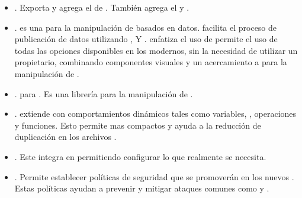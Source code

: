 \begin{itemize}
		\item
			\textbf{\bunyanPackage}. Exporta y agrega el \moduleAS de \loggingCPT \bunyanNAME. También agrega el \clientAS \browserifyNAME y \bunyanprettyStreamMETEOR.
		\item
			\textbf{\dThreePackage}. \dddNAME es una \libraryPC	\javaScriptNAME para la manipulación de  \documentsDB basados en datos. \dThreePackage facilita el proceso de publicación de datos utilizando \htmlNAME, \svgNAME Y \cssNAME. \dThreePackage enfatiza el uso de \webStandardINT permite el uso de todas las opciones disponibles en los \browsersINT modernos, sin la necesidad de utilizar un \frameworkPC propietario, combinando componentes visuales y un acercamiento a \dataDrivenCPT para la manipulación de \htmldomNAME.
		\item
			\textbf{\undStringLatestPackage}. \undStringLatestMETEOR \packageAS para \meteorNAME. Es una librería para la manipulación de \stringsPL.
		\item
			\textbf{\lessPackage}. \lessNAME extiende \cssNAME con comportamientos dinámicos tales como variables, \mixinsNAME, operaciones y funciones. Esto permite  \stylesheetsNAME mas compactos y ayuda a la reducción de duplicación en los archivos \cssNAME. 



		\item
			\textbf{\bootstrapPackage}. Este \packageAS integra \bootstrapNAME en \meteorNAME permitiendo configurar lo que realmente se necesita.
		\item
			\textbf{\browserPolicyPackage}. Permite establecer políticas de seguridad que se promoverán en los nuevos \browsersINT. Estas políticas ayudan a prevenir y mitigar ataques comunes como \crossSiteScriptingINT y \clickjackingINT.
	\end{itemize}


